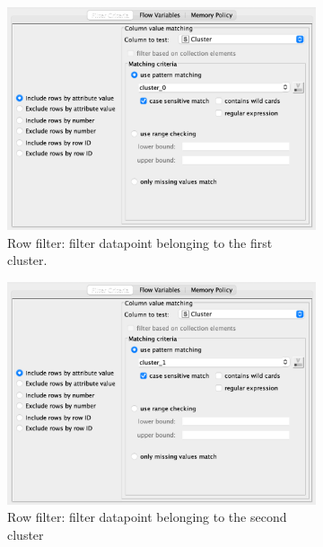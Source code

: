 \documentclass[11pt]{article}
\begin{document}
			\begin{figure}[H]
				\centering
				\begin{subfigure}{0.4\textwidth}
					\includegraphics[width=\textwidth]{res/t1/t14/t14-row-filter-1-conf}
					\caption{Row filter: filter datapoint belonging to the first cluster.}
					\label{fig:first}
				\end{subfigure}
				\hfill
				\begin{subfigure}{0.4\textwidth}
					\includegraphics[width=\textwidth]{res/t1/t14/t14-row-filter-2-conf}
					\caption{Row filter: filter datapoint belonging to the second cluster}
					\label{fig:second}
				\end{subfigure}
				\hfill
				\begin{subfigure}{0.4\textwidth}

\end{subfigure}
\end{figure}
\end{document}
